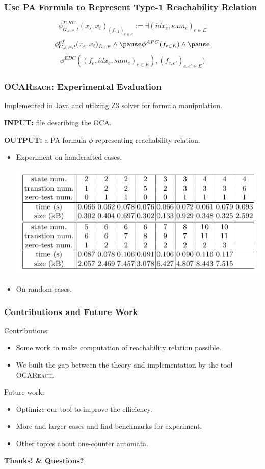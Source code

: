 \documentclass[11pt]{beamer}
\begin{document}
\begin{frame}\frametitle{Use PA Formula to Represent Type-1 Reachability Relation}
\[\phi^{T1RC}_{G_\mathcal{A}, s, t}(x_s, x_t)_{(f_{e,1})_{e\in E}} := \exists (idx_e, sum_e)_{e\in E}\]
\pause
\[\phi^{pf}_{G_\mathcal{A}, s, t}(x_s, x_t)_{f_{e\in E}} \wedge\pause\phi^{APC}(f_{e\in E}) \wedge\pause \]
\[\phi^{EDC}((f_e, idx_e, sum_e)_{e\in E}), (f_{e,e'})_{e,e'\in E})\]


\end{frame}
\begin{frame}\frametitle{\textsc{OCAReach}: Experimental Evaluation}
Implemented in Java and utilzing \textsc{Z3} solver for formula manipulation.

\textbf{INPUT:} file describing the OCA.

\textbf{OUTPUT:} a PA formula $\phi$ representing reachability relation.
\begin{itemize}
\item Experiment on handcrafted cases.
\begin{center}
\includegraphics[scale=0.4]{expoca.png}
\end{center}
\item On random cases.
\end{itemize}
\end{frame}

\begin{frame}\frametitle{Contributions and Future Work}
Contributions:
\begin{itemize}
\item 
Some work to make computation of reachability relation possible.
\item 

We built the gap between the theory and implementation by the tool \textsc{OCAReach}.

\end{itemize}
Future work:

\begin{itemize}

\item Optimize our tool to improve the efficiency.

\item More and larger cases and find benchmarks for experiment.

\item Other topics about one-counter automata.
 
\end{itemize}
\end{frame}

\begin{frame}
\begin{center}
\textbf{Thanks! \& Questions?}
\end{center}
\end{frame}
\end{document}
